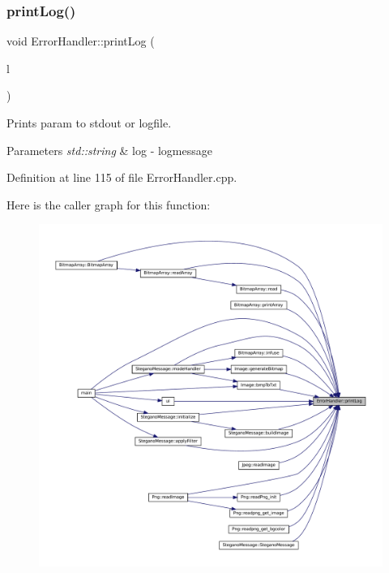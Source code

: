 \subsubsection{\texorpdfstring{printLog()}{printLog()}}
{\footnotesize\ttfamily void Error\+Handler\+::print\+Log (\begin{DoxyParamCaption}\item[{std\+::string}]{l }\end{DoxyParamCaption})}



Prints param to stdout or logfile. 


\begin{DoxyParams}{Parameters}
{\em std\+::string} & log -\/ logmessage \\
\hline
\end{DoxyParams}


Definition at line 115 of file Error\+Handler.\+cpp.

Here is the caller graph for this function\+:\nopagebreak
\begin{figure}[H]
\begin{center}
\leavevmode
\includegraphics[width=350pt]{classErrorHandler_a5ef18327a559b8d77be496dad6a2bf52_icgraph}
\end{center}
\end{figure}
\mbox{\label{classErrorHandler_aa79cfd994939c238b85ad021ea6bbe05}} 
